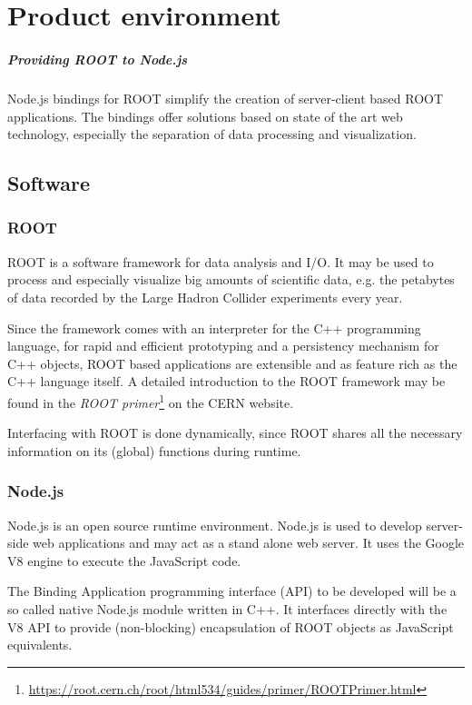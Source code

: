\chapter{Product environment}

\paragraph{Providing ROOT to Node.js}
Node.js bindings for ROOT simplify the creation of server-client based ROOT applications. The bindings offer solutions based on state of the art web technology, especially the separation of data 
processing and visualization.\\

\section{Software}
\subsection{ROOT}

ROOT is a software framework for data analysis and I/O. It may be used to process and especially visualize big amounts of scientific data, e.g. the petabytes of data recorded by the Large Hadron Collider experiments every year.\par
Since the framework comes with an interpreter for the C++ programming language, for rapid and efficient prototyping and a persistency mechanism for C++ objects, ROOT based applications are  extensible and as feature rich as the C++ language itself.
A detailed introduction to the ROOT framework may be found in the \textit{ROOT  primer}\footnote[1]{\url{https://root.cern.ch/root/html534/guides/primer/ROOTPrimer.html}}
on the CERN website. \par
Interfacing with ROOT is done dynamically, since ROOT shares all the necessary information on its (global) functions during runtime.

\subsection{Node.js}

Node.js is an open source runtime environment. Node.js is used to develop server-side web applications and may act as a 
stand alone web server. It uses the Google V8 engine to execute the JavaScript code. \par
The Binding Application programming interface (API) to be developed will be a so called native Node.js module written in C++. It interfaces directly with the V8 API to provide (non-blocking) encapsulation of ROOT objects as JavaScript equivalents.

